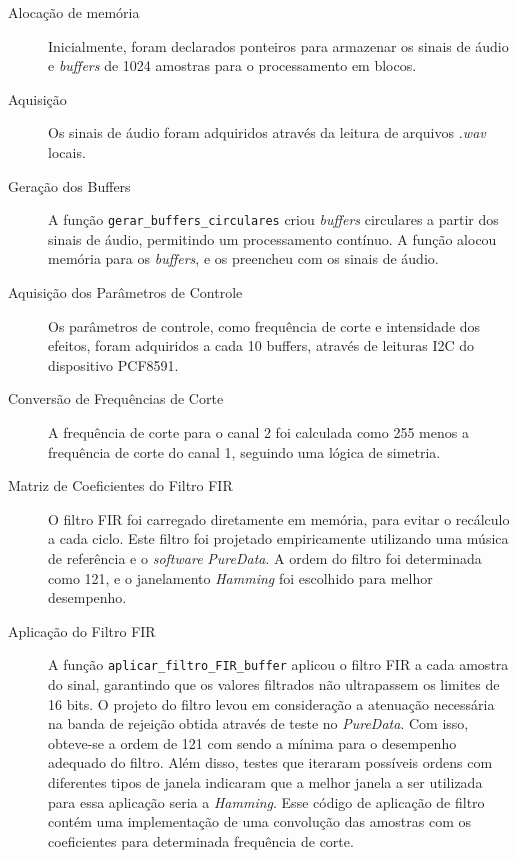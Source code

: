 \begin{description}

\item[Alocação de memória] Inicialmente, foram declarados ponteiros para armazenar os sinais de áudio e \textit{buffers} de 1024 amostras para o processamento em blocos.

\item [Aquisição] Os sinais de áudio foram adquiridos através da leitura de arquivos \textit{.wav} locais.

\item [Geração dos Buffers]

A função \verb|gerar_buffers_circulares| criou \textit{buffers} circulares a partir dos sinais de áudio, permitindo um processamento contínuo. A função alocou memória para os \textit{buffers}, e os preencheu com os sinais de áudio.

\item [Aquisição dos Parâmetros de Controle]

Os parâmetros de controle, como frequência de corte e intensidade dos efeitos, foram adquiridos a cada 10 buffers, através de leituras I2C do dispositivo PCF8591.

\item [Conversão de Frequências de Corte]

A frequência de corte para o canal 2 foi calculada como 255 menos a frequência de corte do canal 1, seguindo uma lógica de simetria.
\item [Matriz de Coeficientes do Filtro FIR]

O filtro FIR foi carregado diretamente em memória, para evitar o recálculo a cada ciclo. Este filtro foi projetado empiricamente utilizando uma música de referência e o \textit{software} \textit{PureData}. A ordem do filtro foi determinada como 121, e o janelamento \textit{Hamming} foi escolhido para melhor desempenho.


\item [Aplicação do Filtro FIR]

A função \verb|aplicar_filtro_FIR_buffer| aplicou o filtro FIR a cada amostra do sinal, garantindo que os valores filtrados não ultrapassem os limites de 16 bits.
O projeto do filtro levou em consideração a atenuação necessária na banda de rejeição obtida através de teste no \textit{PureData}. Com isso, obteve-se a ordem de 121 com sendo a mínima para o desempenho adequado do filtro. Além disso, testes que iteraram possíveis ordens com diferentes tipos de janela indicaram que a melhor janela a ser utilizada para essa aplicação seria a \textit{Hamming}. Esse código de aplicação de filtro contém uma implementação de uma convolução das amostras com os coeficientes para determinada frequência de corte.


\end{description}
